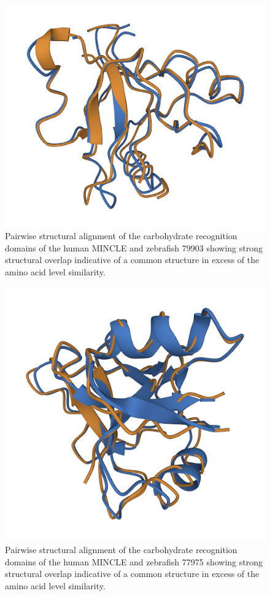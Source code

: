 \begin{figure}
\centering
\includegraphics[width=\textwidth]{images/79903_align.png}
\caption{Pairwise structural alignment of the carbohydrate recognition domains of the human MINCLE and zebrafish 79903 showing strong structural overlap indicative of a common structure in excess of the amino acid level similarity.}
\label{figure:79903}
\end{figure}

\begin{figure}
\centering
\includegraphics[width=\textwidth]{images/77975_align.png}
\caption{Pairwise structural alignment of the carbohydrate recognition domains of the human MINCLE and zebrafish 77975 showing strong structural overlap indicative of a common structure in excess of the amino acid level similarity.}
\label{figure:77975}
\end{figure}

